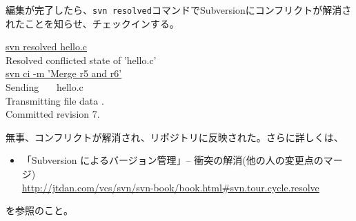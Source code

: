 編集が完了したら、{\tt svn resolved}コマンドでSubversionにコンフリクトが解消されたことを知らせ、チェックインする。
\begin{commandline2}
\prompt \underline{svn resolved hello.c} \\
Resolved conflicted state of 'hello.c' \\
\prompt \underline{svn ci -m 'Merge r5 and r6'} \\
Sending \ \ \ hello.c \\
Transmitting file data . \\
Committed revision 7.
\end{commandline2} \noindent
無事、コンフリクトが解消され、リポジトリに反映された。さらに詳しくは、
\begin{itemize}
  \item 「Subversion によるバージョン管理」-- 衝突の解消(他の人の変更点のマージ) \\
    \url{http://jtdan.com/vcs/svn/svn-book/book.html#svn.tour.cycle.resolve}
\end{itemize}
を参照のこと。
  

